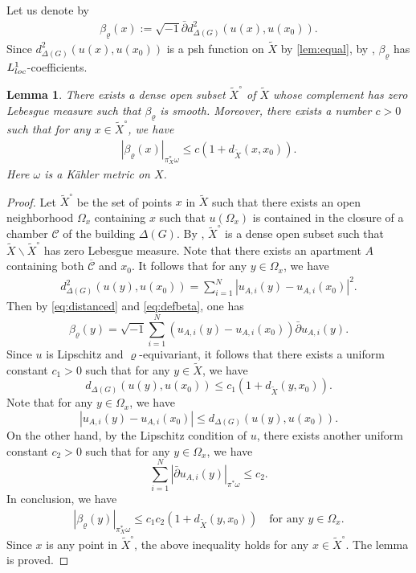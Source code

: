 \documentclass[11pt,a4paper,english]{smfart}
\theoremstyle{plain}
\newtheorem{lemma}[theorem]{Lemma}
\theoremstyle{definition}
\theoremstyle{plain}
\def\db{\bar{\partial}}
\def\cC{\mathcal{C}}
\begin{document}
Let us denote by
\begin{align}\label{eq:defbeta}
	\beta_\varrho(x):=\sqrt{-1}\db d^2_{\Delta(G)}(u(x),u(x_0)).
\end{align}
Since $d^2_{\Delta(G)}(u(x),u(x_0))$ is a psh function on $\widetilde{X}$ by \cref{lem:equal}, by \cite[Theorem 1.46]{GZ17}, $\beta_\varrho$ has $L_{\rm loc}^1$-coefficients. 
 \begin{lemma}\label{lem:distance}
 There exists a dense open subset $\widetilde{X}^\circ $ of $\widetilde{X}$ whose complement has zero Lebesgue measure such that $\beta_\varrho$ is smooth. Moreover, there exists  	a number $c>0$ such that for any $x\in \widetilde{X}^\circ$, we have
 	\begin{align*}
 		|\beta_\varrho(x)|_{\pi_X^*\omega} \leq  c(1+d_{\widetilde{X}}(x, x_0)).
 	\end{align*}  Here $\omega$ is a K\"ahler metric on $X$.
 \end{lemma}
 \begin{proof}
 Let $\widetilde{X}^\circ$ be the set of points $x$ in $\widetilde{X}$ such that there exists an open neighborhood $\Omega_x$ containing $x$ such that $u(\Omega_x)$ is contained in the closure of a chamber $\cC$ of the building $\Delta(G)$.  By \cite[Proposition 4.15]{DM24}, $\widetilde{X}^\circ$ is a dense open subset such that $\widetilde{X}\backslash \widetilde{X}^\circ$  has zero Lebesgue measure. Note that there exists an apartment $A$ containing both $\overline{\cC}$ and $x_0$. It follows that for any $y\in \Omega_{x}$, we have
 \begin{align}\label{eq:distanced}
 	d^2_{\Delta(G)}(u(y),u(x_0))=\sum_{i=1}^{N}|u_{A,i}(y)-u_{A,i}(x_0)|^2.
 \end{align}
 Then  by \eqref{eq:distanced} and \eqref{eq:defbeta}, one has
 	$$
 \beta_\varrho(y)= \sqrt{-1} \sum_{i=1}^{N} (u_{A,i}(y)-u_{A,i}(x_0))\db u_{A,i}(y).
 	$$
 	Since $u$ is   Lipschitz and $\varrho$-equivariant,  it follows that there exists a uniform  constant $c_1>0$ such that for any $y\in \widetilde{X}$, we have $$d_{\Delta(G)}(u(y),u(x_0))\leq  c_1(1+d_{\widetilde{X}}(y, x_0)).$$  
 Note that for any $y\in \Omega_x$, we have
 	$$
 	|u_{A,i}(y)-u_{A,i}(x_0)|\leq  d_{\Delta(G)}(u(y),u(x_0)).
 	$$ 
 	On the other hand, by the Lipschitz condition of $u$, there exists another uniform constant $c_2>0$ such that for any $y\in \Omega_x$, we have
 	$$
 	\sum_{i=1}^{N}|\db u_{A,i}(y)|_{\pi^*\omega}\leq  c_2.
 	$$
 	In conclusion, we have
 	\begin{align*}
 		|\beta_\varrho(y)|_{\pi_X^*\omega} \leq    c_1c_2(1+d_{\widetilde{X}}(y, x_0))\quad \mbox{for any }y\in \Omega_x.
 	\end{align*} 
 	Since $x$ is any point in $\widetilde{X}^\circ$, the above inequality holds for any $x\in \widetilde{X}^\circ$.  The lemma is proved. 
 \end{proof}  
	
\end{document}

